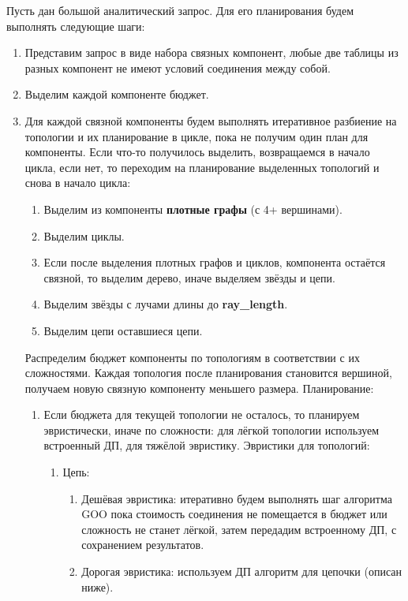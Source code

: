 \documentclass[12pt]{article}
\begin{document}
\begin{flushleft}
Пусть дан большой аналитический запрос. Для его планирования будем выполнять следующие шаги:
\begin{enumerate}
    \item Представим запрос в виде набора связных компонент, любые две таблицы из разных компонент не имеют условий соединения между собой. 
    \item Выделим каждой компоненте бюджет.
    \item Для каждой связной компоненты будем выполнять итеративное разбиение на топологии и их планирование в цикле, пока не получим один план для компоненты. 
    Если что-то получилось выделить, возвращаемся в начало цикла, если нет, то переходим на планирование выделенных топологий и снова в начало цикла:
    \begin{enumerate}
        \item Выделим из компоненты \textbf{плотные графы} (с 4+ вершинами).
        \item Выделим циклы.
        \item Если после выделения  плотных графов и циклов, компонента остаётся связной, то выделим дерево, иначе выделяем звёзды и цепи.
        \item Выделим звёзды с лучами длины до \textbf{ray\_length}.
        \item Выделим цепи оставшиеся цепи.
    \end{enumerate}
    Распределим бюджет компоненты по топологиям в соответствии с их сложностями. Каждая топология после планирования становится вершиной, получаем новую связную компоненту меньшего размера.
    \newline
    Планирование:
    \begin{enumerate}
        \item Если бюджета для текущей топологии не осталось, то планируем эвристически, иначе по сложности: для лёгкой топологии используем встроенный ДП, для 
    тяжёлой эвристику. Эвристики для топологий:
        \begin{enumerate}
            \item Цепь:
            \begin{enumerate}
                \item Дешёвая эвристика: итеративно будем выполнять шаг алгоритма GOO пока стоимость соединения не помещается в бюджет или сложность не станет 
                лёгкой, затем передадим встроенному ДП, с сохранением результатов.
                \item Дорогая эвристика: используем ДП алгоритм для цепочки (описан ниже).

\end{enumerate}
\end{enumerate}
\end{enumerate}
\end{enumerate}
\end{flushleft}
\end{document}
